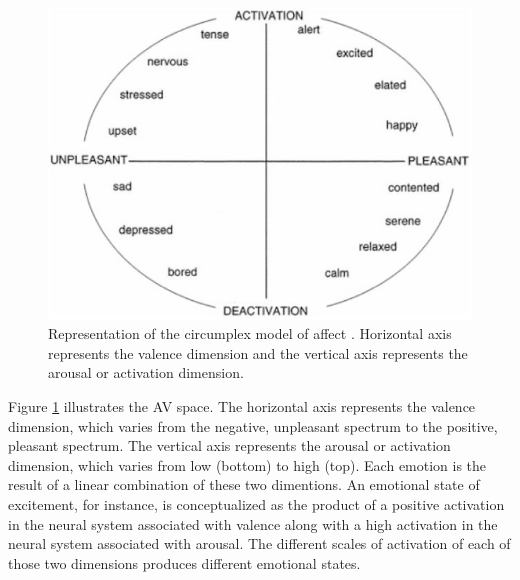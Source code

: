 \begin{figure}[h!]
    \centering
    \includegraphics[scale=0.5]{figures/russell-av.png}
    \caption{Representation of the circumplex model of affect \parencite{posner2005circumplex}. Horizontal axis represents the valence dimension and the vertical axis represents the arousal or activation dimension.}
    \label{fig:av-model}
\end{figure}

Figure \ref{fig:av-model} illustrates the AV space. The horizontal axis represents the valence dimension, which varies from the negative, unpleasant spectrum to the positive, pleasant spectrum. The vertical axis represents the arousal or activation dimension, which varies from low (bottom) to high (top). Each emotion is the result of a linear combination of these two dimentions. An emotional state of excitement, for instance, is conceptualized as the product of a positive activation in the neural system associated with valence along with a high activation in the neural system associated with arousal. The different scales of activation of each of those two dimensions produces different emotional states.


